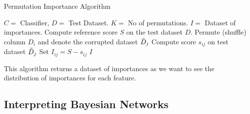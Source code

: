 \begin{algorithm}
    \caption{Permutation Importance Algorithm}
    \begin{algorithmic}
        \REQUIRE $C = $ Classifier, $D = $ Test Dataset. $K = $ No of permutations.
        \ENSURE $I = $ Dataset of importances.
        \STATE Compute reference score $S$ on the test dataset $D$.
                \STATE Permute (shuffle) column $D_{i}$ and denote the corrupted dataset $\Tilde{D}_{j}$
                \STATE Compute score $s_{ij}$ on test dataset $\Tilde{D}_{j}$
                \STATE Set $I_{ij} = S - s_{ij}$
            \ENDFOR
        \ENDFOR
        \RETURN $I$ 
    \end{algorithmic}
\end{algorithm}

This algorithm returns a dataset of importances as we want to see the distribution of importances for each feature.

\subsection{Interpreting Bayesian Networks}

